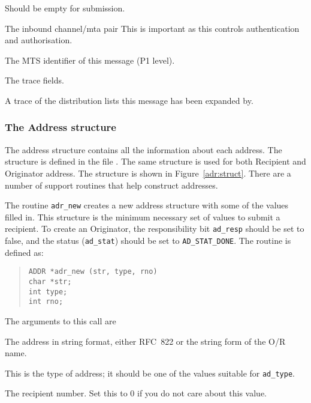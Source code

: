 \begin{describe}
\item[\verb|Raddress|:]	Should be empty for submission.

\item[\verb|inbound|:]	The inbound channel/mta pair
This is important as this controls authentication and authorisation.

\item[\verb|msgid|:]	The MTS identifier of this message (P1 level).

\item[\verb|trace|:]	The trace fields.

\item[\verb|dl\_expansion\_history|:]	A trace of the distribution
lists this message has been expanded by.

\end{describe}

\subsubsection{The Address structure}

The address structure contains all the information about each address.
The structure is defined in the file .  The same structure
is used for both Recipient and Originator address. The structure is
shown in Figure~\ref{adr:struct}. There are a number of support
routines that help construct addresses.

The routine \verb|adr_new| creates a new address structure with some
of the values filled in. This structure is the minimum necessary set
of values to submit a recipient. To create an Originator, the
responsibility bit \verb|ad_resp| should be set to false, and the
status (\verb|ad_stat|) should be set to \verb|AD_STAT_DONE|.
The routine is defined as:
\begin{quote}\small{}\begin{verbatim}
ADDR *adr_new (str, type, rno)
char *str;
int type;
int rno;
\end{verbatim}\end{quote}
The arguments to this call are
\begin{describe}
\item[\verb|str|:] The address in string format, either RFC~822 or the
string form of the O/R name.
\item[\verb|type|:] This is the type of address; it should be one of
the values suitable for \verb|ad_type|.
\item[\verb|rno|:] The recipient number. Set this to 0 if you do not
care about this value.
\end{describe}

